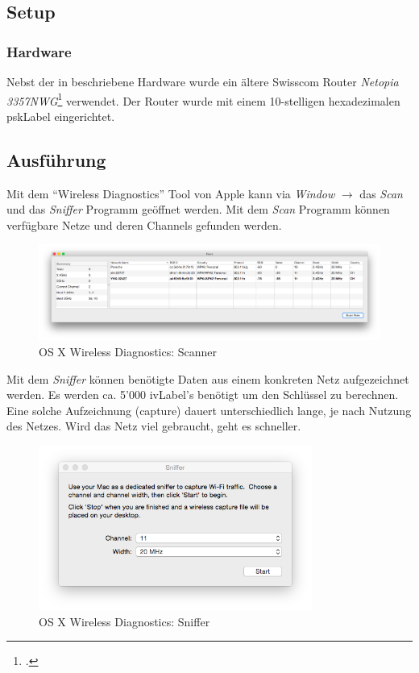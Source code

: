 \subsection{Setup}
\subsubsection{Hardware}
Nebst der in  beschriebene Hardware wurde ein ältere Swisscom Router \textit{Netopia  3357NWG}\footcite{Netopia_3347_57nwg_de_2015-04-06} verwendet. Der Router wurde mit einem 10-stelligen hexadezimalen \gls{pskLabel} eingerichtet.

\subsection{Ausführung}
\label{subsec:wep_crack_tutorial}
Mit dem "`Wireless Diagnostics"' Tool von Apple kann via \textit{Window} $\rightarrow$ das \textit{Scan} und das \textit{Sniffer} Programm geöffnet werden.
Mit dem \textit{Scan} Programm können verfügbare Netze und deren Channels gefunden werden.

\begin{figure}[H]
	\centering
	\includegraphics[width=1.0\textwidth]{images/wep/scan.png}
	\caption{OS X Wireless Diagnostics: Scanner}
\end{figure}

Mit dem \textit{Sniffer} können benötigte Daten aus einem konkreten Netz aufgezeichnet werden. Es werden ca. 5'000 \gls{ivLabel}'s benötigt um den Schlüssel zu berechnen. Eine solche Aufzeichnung (capture) dauert unterschiedlich lange, je nach Nutzung des Netzes. Wird das Netz viel gebraucht, geht es schneller.

\begin{figure}[H]
	\centering
	\includegraphics[width=0.8\textwidth]{images/wep/sniffer.png}
	\caption{OS X Wireless Diagnostics: Sniffer}
\end{figure}

